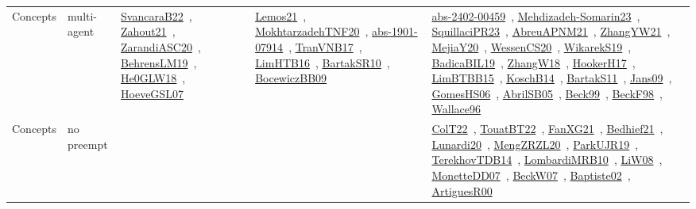 {\begin{longtable}{lp{3cm}>{\raggedright\arraybackslash}p{6cm}>{\raggedright\arraybackslash}p{6cm}>{\raggedright\arraybackslash}p{8cm}}
Concepts & multi-agent & \href{works/SvancaraB22.pdf}{SvancaraB22}~\cite{SvancaraB22}, \href{works/Zahout21.pdf}{Zahout21}~\cite{Zahout21}, \href{works/ZarandiASC20.pdf}{ZarandiASC20}~\cite{ZarandiASC20}, \href{works/BehrensLM19.pdf}{BehrensLM19}~\cite{BehrensLM19}, \href{works/He0GLW18.pdf}{He0GLW18}~\cite{He0GLW18}, \href{works/HoeveGSL07.pdf}{HoeveGSL07}~\cite{HoeveGSL07} & \href{works/Lemos21.pdf}{Lemos21}~\cite{Lemos21}, \href{works/MokhtarzadehTNF20.pdf}{MokhtarzadehTNF20}~\cite{MokhtarzadehTNF20}, \href{works/abs-1901-07914.pdf}{abs-1901-07914}~\cite{abs-1901-07914}, \href{works/TranVNB17.pdf}{TranVNB17}~\cite{TranVNB17}, \href{works/LimHTB16.pdf}{LimHTB16}~\cite{LimHTB16}, \href{works/BartakSR10.pdf}{BartakSR10}~\cite{BartakSR10}, \href{works/BocewiczBB09.pdf}{BocewiczBB09}~\cite{BocewiczBB09} & \href{works/abs-2402-00459.pdf}{abs-2402-00459}~\cite{abs-2402-00459}, \href{works/Mehdizadeh-Somarin23.pdf}{Mehdizadeh-Somarin23}~\cite{Mehdizadeh-Somarin23}, \href{works/SquillaciPR23.pdf}{SquillaciPR23}~\cite{SquillaciPR23}, \href{works/AbreuAPNM21.pdf}{AbreuAPNM21}~\cite{AbreuAPNM21}, \href{works/ZhangYW21.pdf}{ZhangYW21}~\cite{ZhangYW21}, \href{works/MejiaY20.pdf}{MejiaY20}~\cite{MejiaY20}, \href{works/WessenCS20.pdf}{WessenCS20}~\cite{WessenCS20}, \href{works/WikarekS19.pdf}{WikarekS19}~\cite{WikarekS19}, \href{works/BadicaBIL19.pdf}{BadicaBIL19}~\cite{BadicaBIL19}, \href{works/ZhangW18.pdf}{ZhangW18}~\cite{ZhangW18}, \href{works/HookerH17.pdf}{HookerH17}~\cite{HookerH17}, \href{works/LimBTBB15.pdf}{LimBTBB15}~\cite{LimBTBB15}, \href{works/KoschB14.pdf}{KoschB14}~\cite{KoschB14}, \href{works/BartakS11.pdf}{BartakS11}~\cite{BartakS11}, \href{works/Jans09.pdf}{Jans09}~\cite{Jans09}, \href{works/GomesHS06.pdf}{GomesHS06}~\cite{GomesHS06}, \href{works/AbrilSB05.pdf}{AbrilSB05}~\cite{AbrilSB05}, \href{works/Beck99.pdf}{Beck99}~\cite{Beck99}, \href{works/BeckF98.pdf}{BeckF98}~\cite{BeckF98}, \href{works/Wallace96.pdf}{Wallace96}~\cite{Wallace96}\\
Concepts & no preempt &  &  & \href{works/ColT22.pdf}{ColT22}~\cite{ColT22}, \href{works/TouatBT22.pdf}{TouatBT22}~\cite{TouatBT22}, \href{works/FanXG21.pdf}{FanXG21}~\cite{FanXG21}, \href{works/Bedhief21.pdf}{Bedhief21}~\cite{Bedhief21}, \href{works/Lunardi20.pdf}{Lunardi20}~\cite{Lunardi20}, \href{works/MengZRZL20.pdf}{MengZRZL20}~\cite{MengZRZL20}, \href{works/ParkUJR19.pdf}{ParkUJR19}~\cite{ParkUJR19}, \href{works/TerekhovTDB14.pdf}{TerekhovTDB14}~\cite{TerekhovTDB14}, \href{works/LombardiMRB10.pdf}{LombardiMRB10}~\cite{LombardiMRB10}, \href{works/LiW08.pdf}{LiW08}~\cite{LiW08}, \href{works/MonetteDD07.pdf}{MonetteDD07}~\cite{MonetteDD07}, \href{works/BeckW07.pdf}{BeckW07}~\cite{BeckW07}, \href{works/Baptiste02.pdf}{Baptiste02}~\cite{Baptiste02}, \href{works/ArtiguesR00.pdf}{ArtiguesR00}~\cite{ArtiguesR00}\\

\end{longtable}}
